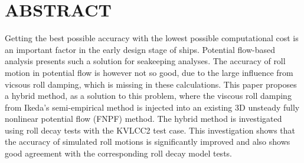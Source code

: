 \section*{ABSTRACT}\label{abstract}
Getting the best possible accuracy with the lowest possible
computational cost is an important factor in the early design stage of
ships. Potential flow-based analysis presents such a solution for
seakeeping analyses. The accuracy of roll motion in potential flow is
however not so good, due to the large influence from vicsous roll
damping, which is missing in these calculations. This paper proposes a
hybrid method, as a solution to this problem, where the viscous roll
damping from Ikeda's semi-empirical method is injected into an existing
3D unsteady fully nonlinear potential flow (FNPF) method. The hybrid
method is investigated using roll decay tests with the KVLCC2 test case.
This investigation shows that the accuracy of simulated roll motions is
significantly improved and also shows good agreement with the
corresponding roll decay model tests.
